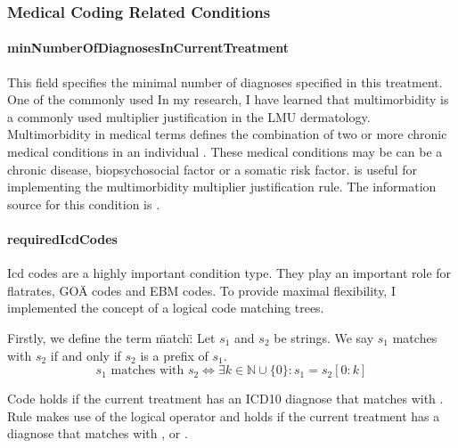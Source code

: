 \subsubsection{Medical Coding Related Conditions}

\paragraph{minNumberOfDiagnosesInCurrentTreatment}
This field specifies the minimal number of diagnoses specified in this treatment.
One of the commonly used
In my research, I have learned that multimorbidity is a commonly used multiplier justification in the LMU dermatology.
Multimorbidity in medical terms defines the combination of two or more chronic medical conditions in an individual \cite{Reste2013The}.
These medical conditions may be can be a chronic disease, biopsychosocial factor or a somatic risk factor.
 is useful for implementing the multimorbidity multiplier justification rule.
The information source for this condition is .

\paragraph{requiredIcdCodes}

Icd codes are a highly important condition type.
They play an important role for flatrates, GOÄ codes and EBM codes.
To provide maximal flexibility, I implemented the concept of a logical code matching trees.



Firstly, we define the term \"match\":
Let \( s_1 \) and \( s_2 \) be strings.
We say \( s_1 \) matches with \( s_2 \) if and only if \( s_2 \) is a prefix of \( s_1 \).
\begin{equation}\label{eq:matching}
    s_1 \text{ matches with } s_2 \iff \exists k \in \mathbb{N} \cup \{0\} : s_1 = s_2[0:k]
\end{equation}

Code  holds if the current treatment has an ICD10 diagnose that matches with .
Rule  makes use of the logical  operator and holds if the current treatment has a diagnose that matches with ,  or .

